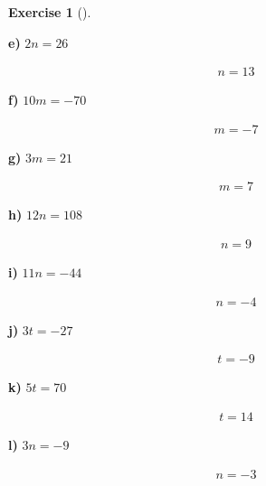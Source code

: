 \documentclass[
  letterpaper,
  DIV=11,
  numbers=noendperiod]{scrreprt}
\theoremstyle{definition}
\newtheorem{exercise}{Exercise}[chapter]
\theoremstyle{remark}
\begin{document}
\begin{exercise}[]
\begin{tcolorbox}
\textbf{e)} \(\displaystyle 2n = 26\)

\begin{align*}
n = 13
\end{align*}

\textbf{f)} \(\displaystyle 10m = -70\)

\begin{align*}
m = -7
\end{align*}

\textbf{g)} \(\displaystyle 3m = 21\)

\begin{align*}
m = 7
\end{align*}

\textbf{h)} \(\displaystyle 12n = 108\)

\begin{align*}
n = 9
\end{align*}

\textbf{i)} \(\displaystyle 11n = -44\)

\begin{align*}
n = -4
\end{align*}

\textbf{j)} \(\displaystyle 3t = -27\)

\begin{align*}
t = -9
\end{align*}

\textbf{k)} \(\displaystyle 5t = 70\)

\begin{align*}
t = 14
\end{align*}

\textbf{l)} \(\displaystyle 3n = -9\)

\begin{align*}
n = -3
\end{align*}

\end{tcolorbox}

\end{exercise}
\end{document}
